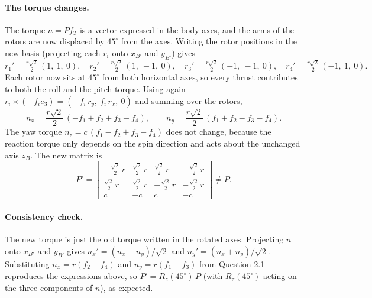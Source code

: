 \paragraph{The torque changes.}
The torque $n = P f_T$ is a vector expressed in the body axes, and the arms of the rotors are now displaced by $45^\circ$ from the axes.
Writing the rotor positions in the new basis (projecting each $r_i$ onto $x_{B'}$ and $y_{B'}$) gives
\begin{equation*}
r_1' = \tfrac{r\sqrt{2}}{2}\,(1,\ 1,\ 0), \quad
r_2' = \tfrac{r\sqrt{2}}{2}\,(1,\ -1,\ 0), \quad
r_3' = \tfrac{r\sqrt{2}}{2}\,(-1,\ -1,\ 0), \quad
r_4' = \tfrac{r\sqrt{2}}{2}\,(-1,\ 1,\ 0).
\end{equation*}
Each rotor now sits at $45^\circ$ from both horizontal axes, so every thrust contributes to both the roll and the pitch torque.
Using again $r_i \times (-f_i e_3) = (-f_i\, r_{y},\ f_i\, r_{x},\ 0)$ and summing over the rotors,
\begin{equation*}
n_x = \frac{r\sqrt{2}}{2}\,(-f_1 + f_2 + f_3 - f_4), \qquad
n_y = \frac{r\sqrt{2}}{2}\,(f_1 + f_2 - f_3 - f_4).
\end{equation*}
The yaw torque $n_z = c\,(f_1 - f_2 + f_3 - f_4)$ does not change, because the reaction torque only depends on the spin direction and acts about the unchanged axis $z_B$.
The new matrix is
\begin{equation*}
P' = \begin{bmatrix}
-\frac{\sqrt{2}}{2}\,r & \frac{\sqrt{2}}{2}\,r & \frac{\sqrt{2}}{2}\,r & -\frac{\sqrt{2}}{2}\,r \\[4pt]
\frac{\sqrt{2}}{2}\,r & \frac{\sqrt{2}}{2}\,r & -\frac{\sqrt{2}}{2}\,r & -\frac{\sqrt{2}}{2}\,r \\[4pt]
c & -c & c & -c
\end{bmatrix} \neq P .
\end{equation*}

\paragraph{Consistency check.}
The new torque is just the old torque written in the rotated axes.
Projecting $n$ onto $x_{B'}$ and $y_{B'}$ gives $n_x' = (n_x - n_y)/\sqrt{2}$ and $n_y' = (n_x + n_y)/\sqrt{2}$.
Substituting $n_x = r(f_2 - f_4)$ and $n_y = r(f_1 - f_3)$ from Question 2.1 reproduces the expressions above, so $P' = R_z(45^\circ)\,P$ (with $R_z(45^\circ)$ acting on the three components of $n$), as expected.
